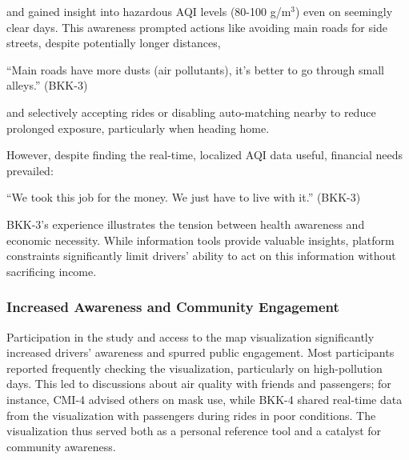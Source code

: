 and gained insight into hazardous AQI levels (80-100 \textmu{}g/m$^3$) even on seemingly clear days. This awareness prompted actions like avoiding main roads for side streets, despite potentially longer distances,
\begin{quoteb}
    ``Main roads have more dusts (air pollutants), it’s better to go through small alleys.'' (BKK-3)
\end{quoteb}

and selectively accepting rides or disabling auto-matching nearby to reduce prolonged exposure, particularly when heading home.


However, despite finding the real-time, localized AQI data useful, financial needs prevailed:

\begin{quoteb}
    ``We took this job for the money. We just have to live with it.'' (BKK-3)
\end{quoteb}

BKK-3's experience illustrates the tension between health awareness and economic necessity.
While information tools provide valuable insights, platform constraints significantly limit drivers' ability to act on this information without sacrificing income.

\subsubsection{Increased Awareness and Community Engagement}
Participation in the study and access to the map visualization significantly increased drivers' awareness and spurred public engagement.
Most participants reported frequently checking the visualization, particularly on high-pollution days.
This led to discussions about air quality with friends and passengers; for instance, CMI-4 advised others on mask use, while BKK-4 shared real-time data from the visualization with passengers during rides in poor conditions.
The visualization thus served both as a personal reference tool and a catalyst for community awareness.

